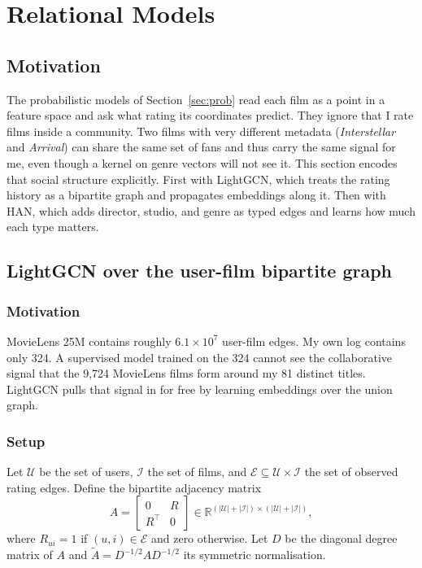 \documentclass{article}
\begin{document}
\section{Relational Models}
\label{sec:rel}

\subsection{Motivation}

The probabilistic models of Section~\ref{sec:prob} read each film as a point in a feature space and ask what rating its coordinates predict. They ignore that I rate films inside a community. Two films with very different metadata (\textit{Interstellar} and \textit{Arrival}) can share the same set of fans and thus carry the same signal for me, even though a kernel on genre vectors will not see it. This section encodes that social structure explicitly. First with LightGCN, which treats the rating history as a bipartite graph and propagates embeddings along it. Then with HAN, which adds director, studio, and genre as typed edges and learns how much each type matters.

\subsection{LightGCN over the user-film bipartite graph}
\label{sec:lightgcn}

\subsubsection*{Motivation}

MovieLens 25M contains roughly $6.1 \times 10^7$ user-film edges. My own log contains only 324. A supervised model trained on the 324 cannot see the collaborative signal that the 9{,}724 MovieLens films form around my 81 distinct titles. LightGCN pulls that signal in for free by learning embeddings over the union graph.

\subsubsection*{Setup}

Let $\mathcal{U}$ be the set of users, $\mathcal{I}$ the set of films, and $\mathcal{E} \subseteq \mathcal{U} \times \mathcal{I}$ the set of observed rating edges. Define the bipartite adjacency matrix
\begin{equation}
A = \begin{bmatrix} 0 & R \\ R^\top & 0 \end{bmatrix} \in \mathbb{R}^{(|\mathcal{U}| + |\mathcal{I}|) \times (|\mathcal{U}| + |\mathcal{I}|)},
\label{eq:lightgcn-adj}
\end{equation}
where $R_{ui} = 1$ if $(u, i) \in \mathcal{E}$ and zero otherwise. Let $D$ be the diagonal degree matrix of $A$ and $\tilde{A} = D^{-1/2} A D^{-1/2}$ its symmetric normalisation.
\end{document}
